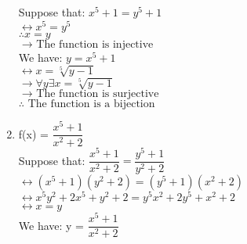 \documentclass[10pt]{article}
\begin{document}
\begin{enumerate}
Suppose that: $x^5 + 1 = y^5 + 1$\\
$\leftrightarrow{x^5 = y^5}$\\
$\therefore{x = y}$\\
$\rightarrow{\mbox{ The function is injective }}$\\
We have: $y = x^5 + 1$\\
$\leftrightarrow{x = \sqrt[5]{y - 1}}$\\
$\rightarrow \forall y \exists x = \sqrt[5]{y - 1}$\\
$\rightarrow{\mbox{ The function is surjective }}$\\
$\therefore{\mbox{ The function is a bijection }}$\\ 
\item f(x) = $\dfrac{x^{5} +1}{x^{2} +2}$\\
Suppose that: $\dfrac{x^{5} +1}{x^{2} +2} = \dfrac{y^{5} +1}{y^{2} +2}$\\
$\leftrightarrow{(x^5 + 1)(y^2 +2) = (y^5 + 1)(x^2 + 2)}$\\
 $\leftrightarrow{x^5y^2 + 2x^5 + y^2 + 2 = y^5x^2 + 2y^5 + x^2 + 2}$\\
  $\leftrightarrow{x = y}$\\
We have: y = $\dfrac{x^{5} +1}{x^{2} +2}$     
\end{enumerate}
\end{document}
